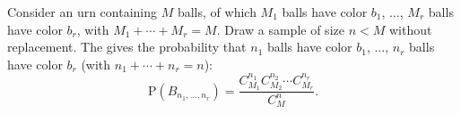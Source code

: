 Consider an urn containing $M$ balls, of which $M_1$ balls have color $b_1$, $\ldots$, $M_r$ balls have color $b_r$, with $M_1 + \cdots + M_r = M$. Draw a sample of size $n < M$ without replacement. The  gives the probability that $n_1$ balls have color $b_1$, $\ldots$, $n_r$ balls have color $b_r$ (with $n_1 + \cdots + n_r = n$):
$$\text{P}(B_{n_1, \ldots, n_r}) = \frac{C_{M_1}^{n_1} C_{M_2}^{n_2} \cdots C_{M_r}^{n_r}}{C_M^n}.$$
